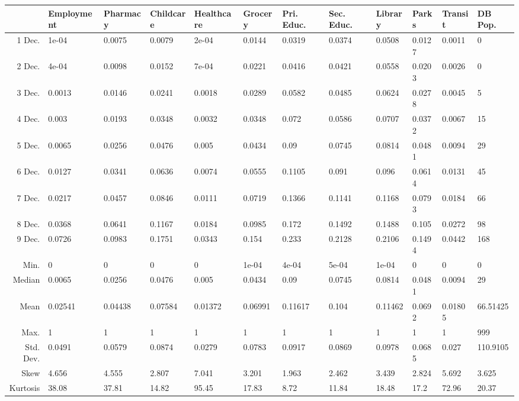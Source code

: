 \documentclass[11pt, a4paper]{article}
\begin{document}
\begin{sidewaystable}[ht]
\centering
\begin{tabular}{rlllllllllll}
  \hline
 & Employment & Pharmacy & Childcare & Healthcare & Grocery & Pri. Educ. & Sec. Educ. & Library & Parks & Transit & DB Pop. \\ 
  \hline
1 Dec. & 1e-04 & 0.0075 & 0.0079 & 2e-04 & 0.0144 & 0.0319 & 0.0374 & 0.0508 & 0.0127 & 0.0011 & 0 \\ 
  2 Dec. & 4e-04 & 0.0098 & 0.0152 & 7e-04 & 0.0221 & 0.0416 & 0.0421 & 0.0558 & 0.0203 & 0.0026 & 0 \\ 
  3 Dec. & 0.0013 & 0.0146 & 0.0241 & 0.0018 & 0.0289 & 0.0582 & 0.0485 & 0.0624 & 0.0278 & 0.0045 & 5 \\ 
  4 Dec. & 0.003 & 0.0193 & 0.0348 & 0.0032 & 0.0348 & 0.072 & 0.0586 & 0.0707 & 0.0372 & 0.0067 & 15 \\ 
  5 Dec. & 0.0065 & 0.0256 & 0.0476 & 0.005 & 0.0434 & 0.09 & 0.0745 & 0.0814 & 0.0481 & 0.0094 & 29 \\ 
  6 Dec. & 0.0127 & 0.0341 & 0.0636 & 0.0074 & 0.0555 & 0.1105 & 0.091 & 0.096 & 0.0614 & 0.0131 & 45 \\ 
  7 Dec. & 0.0217 & 0.0457 & 0.0846 & 0.0111 & 0.0719 & 0.1366 & 0.1141 & 0.1168 & 0.0793 & 0.0184 & 66 \\ 
  8 Dec. & 0.0368 & 0.0641 & 0.1167 & 0.0184 & 0.0985 & 0.172 & 0.1492 & 0.1488 & 0.105 & 0.0272 & 98 \\ 
  9 Dec. & 0.0726 & 0.0983 & 0.1751 & 0.0343 & 0.154 & 0.233 & 0.2128 & 0.2106 & 0.1494 & 0.0442 & 168 \\ 
  Min. & 0 & 0 & 0 & 0 & 1e-04 & 4e-04 & 5e-04 & 1e-04 & 0 & 0 & 0 \\ 
  Median & 0.0065 & 0.0256 & 0.0476 & 0.005 & 0.0434 & 0.09 & 0.0745 & 0.0814 & 0.0481 & 0.0094 & 29 \\ 
  Mean & 0.02541 & 0.04438 & 0.07584 & 0.01372 & 0.06991 & 0.11617 & 0.104 & 0.11462 & 0.0692 & 0.01805 & 66.51425 \\ 
  Max. & 1 & 1 & 1 & 1 & 1 & 1 & 1 & 1 & 1 & 1 & 999 \\ 
  Std. Dev. & 0.0491 & 0.0579 & 0.0874 & 0.0279 & 0.0783 & 0.0917 & 0.0869 & 0.0978 & 0.0685 & 0.027 & 110.9105 \\ 
  Skew & 4.656 & 4.555 & 2.807 & 7.041 & 3.201 & 1.963 & 2.462 & 3.439 & 2.824 & 5.692 & 3.625 \\ 
  Kurtosis & 38.08 & 37.81 & 14.82 & 95.45 & 17.83 & 8.72 & 11.84 & 18.48 & 17.2 & 72.96 & 20.37 \\ 
   \hline
\end{tabular}
\end{sidewaystable}
\end{document}
